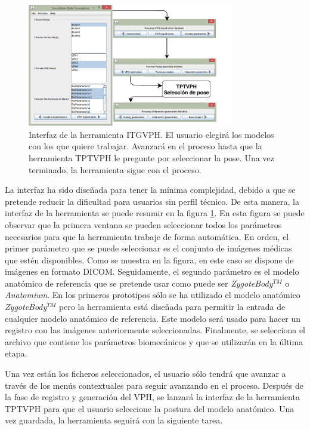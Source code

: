 \begin{figure}[h]
    \centering
    \includegraphics[width=0.8\textwidth]{IMG/toolkitui.png}
    \caption{Interfaz de la herramienta \ac{ITGVPH}. El usuario elegirá los modelos con los que quiere trabajar. Avanzará en el proceso hasta que la herramienta TPTVPH le pregunte por seleccionar la pose. Una vez terminado, la herramienta sigue con el proceso.}
    \label{fig:toolui}
\end{figure}


La interfaz ha sido diseñada para tener la mínima complejidad, debido a que se pretende reducir la dificultad para usuarios sin perfil técnico. De esta manera, la interfaz de la herramienta se puede resumir en la figura \ref{fig:toolui}. En esta figura se puede observar que la primera ventana se pueden seleccionar todos los parámetros necesarios para que la herramienta trabaje de forma automática.
En orden, el primer parámetro que se puede seleccionar es el conjunto de imágenes médicas que estén disponibles. Como se muestra en la figura, en este caso se dispone de imágenes en formato \ac{DICOM}.
Seguidamente, el segundo parámetro es el modelo anatómico de referencia que se pretende usar como puede ser \emph{ZygoteBody}$^{TM}$ o \emph{Anatomium}. En los primeros prototipos sólo se ha utilizado el modelo anatómico \emph{ZygoteBody}$^{TM}$ pero la herramienta está diseñada para permitir la entrada de cualquier modelo anatómico de referencia. Este modelo será usado para hacer un registro con las imágenes anteriormente seleccionadas. 
Finalmente, se selecciona el archivo que contiene los parámetros biomecánicos y que se utilizarán en la última etapa.



Una vez están los ficheros seleccionados, el usuario sólo tendrá que avanzar a través de los menús contextuales para seguir avanzando en el proceso. Después de la fase de registro y generación del \ac{VPH}, se lanzará la interfaz de la herramienta \ac{TPTVPH} para que el usuario seleccione la postura del modelo anatómico. Una vez guardada, la herramienta seguirá con la siguiente tarea.


